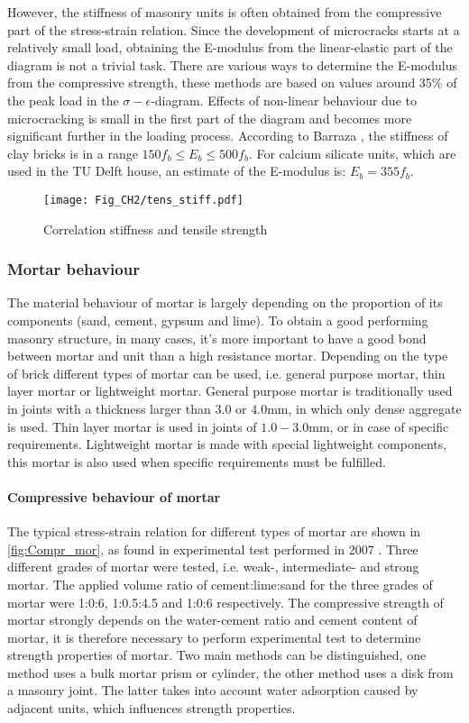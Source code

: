 However, the stiffness of masonry units is often obtained from the compressive part of the stress-strain relation. Since the development of microcracks starts at a relatively small load, obtaining the E-modulus from the linear-elastic part of the diagram is not a trivial task. There are various ways to determine the E-modulus from the compressive strength, these methods are based on values around 35\% of the peak load in the $\sigma - \epsilon $-diagram. Effects of non-linear behaviour due to microcracking is small in the first part of the diagram and becomes more significant further in the loading process. According to Barraza \cite{barraza2012numerical}, the stiffness of clay bricks is in a range $150f_{b} \leq E_{b} \leq500f_{b}$. For calcium silicate units, which are used in the TU Delft house, an estimate of the E-modulus is: $E_{b}=355f_{b}$.

\begin{figure}[!htb]
    \centering
    \texttt{[image: Fig\_CH2/tens\_stiff.pdf]}
    \caption{Correlation stiffness and tensile strength \cite{vasconcelos2005experimental}}
    \label{fig:Tens_stiff}
\end{figure}

\subsubsection{Mortar behaviour}
The material behaviour of mortar is largely depending on the proportion of its components (sand, cement, gypsum and lime). To obtain a good performing masonry structure, in many cases, it's more important to have a good bond between mortar and unit than a high resistance mortar. Depending on the type of brick different types of mortar can be used, i.e. general purpose mortar, thin layer mortar or lightweight mortar. General purpose mortar is traditionally used in joints with a thickness larger than $3.0$ or $4.0$mm, in which only dense aggregate is used. Thin layer mortar is used in joints of $1.0-3.0$mm, or in case of specific requirements. Lightweight mortar is made with special lightweight components, this mortar is also used when specific requirements must be fulfilled. 

\paragraph{Compressive behaviour of mortar}
The typical stress-strain relation for different types of mortar are shown in \autoref{fig:Compr_mor}, as found in experimental test performed in 2007 \cite{kaushik2007}. Three different grades of mortar were tested, i.e. weak-, intermediate- and strong mortar. The applied volume ratio of cement:lime:sand for the three grades of mortar were 1:0:6, 1:0.5:4.5 and 1:0:6 respectively. The compressive strength of mortar strongly depends on the water-cement ratio and cement content of mortar, it is therefore necessary to perform experimental test to determine strength properties of mortar. Two main methods can be distinguished, one method uses a bulk mortar prism or cylinder, the other method uses a disk from a masonry joint. The latter takes into account water adsorption caused by adjacent units, which influences strength properties. 

